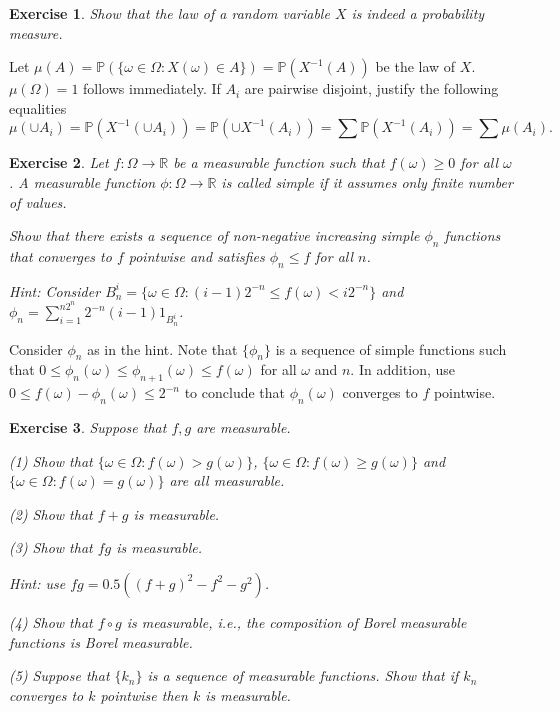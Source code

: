 \documentclass[letter,11pt]{article}
\newtheorem{exercise}{Exercise}[section]
\begin{document}
\begin{exercise} 
Show that the law of a random variable $X$ is indeed a probability measure. 
\end{exercise}

Let $\mu (A) = \mathbb{P} (\{ \omega \in \Omega : X(\omega) \in A  \} ) =  \mathbb{P} ( X^{-1}(A) ) $ be the law of $X$. $\mu (\Omega) = 1$ follows immediately.  
If $A_{i}$ are pairwise disjoint, justify the following 
equalities 
$$\mu (\cup A_{i} ) = \mathbb{P} ( X^{-1} (\cup  A_{i} ) ) =  \mathbb{P} (  \cup X^{-1}(A_{i}) ) = \sum \mathbb {P} ( X^{-1}(A_{i}) ) = \sum \mu (A_{i}) .$$ 


\begin{exercise}
    Let $f:\Omega \rightarrow \mathbb{R}$ be a measurable function such that $f(\omega) \geq 0$ for all $\omega$. A measurable function $\phi : \Omega \rightarrow \mathbb{R}$ is called simple if it assumes only finite number of values. 

Show that there exists a sequence of non-negative increasing simple $\phi_{n}$ functions that converges to $f$ pointwise and satisfies $\phi _{n} \leq f$ for all $n$.


Hint: Consider $B_{n}^{i} = \{ \omega \in \Omega: (i-1)2^{-n} \leq f(\omega) < i2^{-n} \} $ and $\phi _{n} = \sum _{i=1}^{n2^n} 2^{-n}(i-1) 1_{B_{n}^{i} } $. 
\end{exercise}


Consider $\phi_{n}$ as in the hint. Note that $\{\phi_{n} \}$ is a sequence of simple functions such that $ 0 \leq \phi_{n}(\omega) \leq \phi_{n+1}(\omega) \leq f(\omega)$ for all $\omega$ and $n$. In addition, use $ 0 \leq f(\omega) - \phi_{n}(\omega) \leq 2^{-n}$ to conclude that $\phi _{n} (\omega) $ converges to $f$ pointwise. 





\begin{exercise} 
Suppose that $f,g$ are measurable. 

(1) Show that $ \{ \omega \in \Omega: f(\omega) > g(\omega) \}$, $ \{ \omega \in \Omega: f(\omega) \geq g(\omega) \}$ and $\{ \omega \in \Omega: f(\omega) = g(\omega) \}$ are all measurable. 

(2) Show that $f + g$ is measurable. 

(3) Show that $fg$ is measurable.

Hint: use  $fg = 0.5 ( (f+g)^2 - f^2 - g^2)$.

(4) Show that $f \circ g$ is measurable, i.e.,  the composition of Borel measurable functions is Borel measurable. 

(5)  Suppose that $\{k_{n} \}$ is a sequence of measurable functions. Show that if $k_{n}$ converges to $k$ pointwise then $k$ is measurable. 
\end{exercise}
\end{document}
